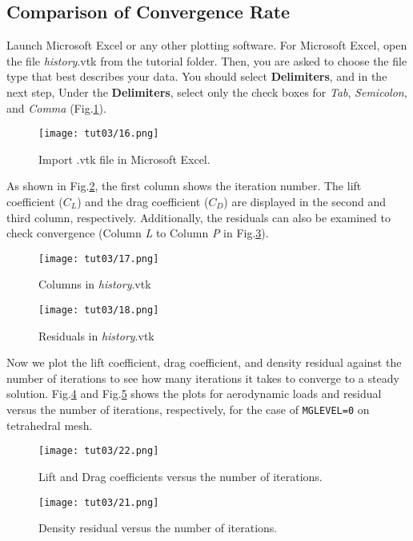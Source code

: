 \subsection{Comparison of Convergence Rate}
Launch Microsoft Excel or any other plotting software. For Microsoft Excel, open the file \textit{history}.vtk from the tutorial folder. Then, you are asked to choose the file type that best describes your data. You should select \textbf{Delimiters}, and in the next step, Under the \textbf{Delimiters}, select only the check boxes for \textit{Tab}, \textit{Semicolon}, and \textit{Comma} (Fig.\ref{Fig11}).
\begin{figure}[htbp]
    \centering
    \texttt{[image: tut03/16.png]}
    \caption{Import .vtk file in Microsoft Excel.}
    \label{Fig11}
\end{figure}
As shown in Fig.\ref{Fig12}, the first column shows the iteration number. The lift coefficient ($C_L$) and the drag coefficient ($C_D$) are displayed in the second and third column, respectively. Additionally, the residuals can also be examined to check convergence (Column \textit{L} to Column \textit{P} in Fig.\ref{Fig13}).
\begin{figure}[htbp]
    \centering
    \texttt{[image: tut03/17.png]}
    \caption{Columns in \textit{history}.vtk}
    \label{Fig12}
\end{figure}
\begin{figure}[htbp]
    \centering
    \texttt{[image: tut03/18.png]}
    \caption{Residuals in \textit{history}.vtk}
    \label{Fig13}
\end{figure}
Now we plot the lift coefficient, drag coefficient, and density residual against the number of iterations to see how many iterations it takes to converge to a steady solution. Fig.\ref{Fig14} and Fig.\ref{Fig15} shows the plots for aerodynamic loads and residual versus the number of iterations, respectively, for the case of \texttt{MGLEVEL=0} on tetrahedral mesh.
\begin{figure}[htbp]
    \centering
    \texttt{[image: tut03/22.png]}
    \caption{Lift and Drag coefficients versus the number of iterations.}
    \label{Fig14}
\end{figure}
\begin{figure}[htbp]
    \centering
    \texttt{[image: tut03/21.png]}
    \caption{Density residual versus the number of iterations.}
    \label{Fig15}
\end{figure}
